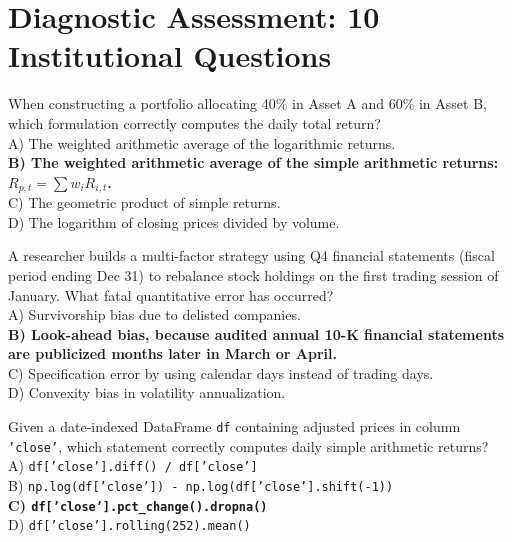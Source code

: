 \documentclass[11pt,a4paper]{article}
\begin{document}
\section{Diagnostic Assessment: 10 Institutional Questions}

\begin{infobox}
When constructing a portfolio allocating 40\% in Asset A and 60\% in Asset B, which formulation correctly computes the daily total return?\\
A) The weighted arithmetic average of the logarithmic returns.\\
\textbf{B) The weighted arithmetic average of the simple arithmetic returns: $R_{p,t} = \sum w_i R_{i,t}$.}\\
C) The geometric product of simple returns.\\
D) The logarithm of closing prices divided by volume.
\end{infobox}

\begin{infobox}
A researcher builds a multi-factor strategy using Q4 financial statements (fiscal period ending Dec 31) to rebalance stock holdings on the first trading session of January. What fatal quantitative error has occurred?\\
A) Survivorship bias due to delisted companies.\\
\textbf{B) Look-ahead bias, because audited annual 10-K financial statements are publicized months later in March or April.}\\
C) Specification error by using calendar days instead of trading days.\\
D) Convexity bias in volatility annualization.
\end{infobox}

\begin{infobox}
Given a date-indexed DataFrame \texttt{df} containing adjusted prices in column \texttt{'close'}, which statement correctly computes daily simple arithmetic returns?\\
A) \texttt{df['close'].diff() / df['close']}\\
B) \texttt{np.log(df['close']) - np.log(df['close'].shift(-1))}\\
\textbf{C) \texttt{df['close'].pct_change().dropna()}}\\
D) \texttt{df['close'].rolling(252).mean()}
\end{infobox}
\end{document}
